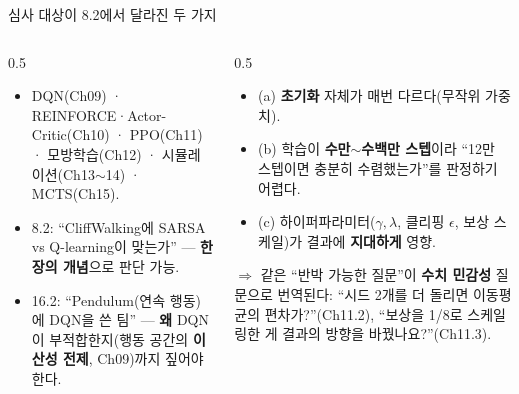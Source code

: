 \begin{frame}{심사 대상이 8.2에서 달라진 두 가지}
  \begin{columns}[T]
    \begin{column}{0.5\textwidth}
      \begin{itemize}
        \item DQN(Ch09) · REINFORCE·Actor-Critic(Ch10) · PPO(Ch11) ·
          모방학습(Ch12) · 시뮬레이션(Ch13$\sim$14) · MCTS(Ch15).
        \item 8.2: ``CliffWalking에 SARSA vs Q-learning이 맞는가'' —
          \textbf{한 장의 개념}으로 판단 가능.
        \item 16.2: ``Pendulum(연속 행동)에 DQN을 쓴 팀'' — \textbf{왜} DQN이
          부적합한지(행동 공간의 \textbf{이산성 전제}, Ch09)까지 짚어야
          한다.
      \end{itemize}
    \end{column}
    \begin{column}{0.5\textwidth}
      \begin{itemize}
        \item (a) \textbf{초기화} 자체가 매번 다르다(무작위 가중치).
        \item (b) 학습이 \textbf{수만$\sim$수백만 스텝}이라 ``12만 스텝이면
          충분히 수렴했는가''를 판정하기 어렵다.
        \item (c) 하이퍼파라미터($\gamma, \lambda$, 클리핑 $\epsilon$, 보상
          스케일)가 결과에 \textbf{지대하게} 영향.
      \end{itemize}
      $\Rightarrow$ 같은 ``반박 가능한 질문''이 \textbf{수치 민감성} 질문으로
      번역된다: ``시드 2개를 더 돌리면 이동평균의 편차가?''(Ch11.2),
      ``보상을 1/8로 스케일링한 게 결과의 방향을 바꿨나요?''(Ch11.3).
    \end{column}
  \end{columns}
\end{frame}

